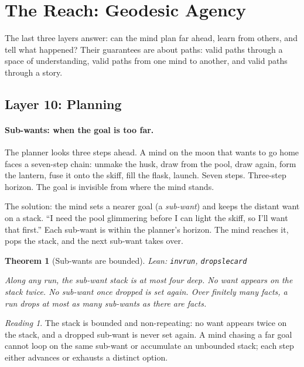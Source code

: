 \documentclass[11pt]{article}
\newcommand{\leanus}{\textunderscore\allowbreak}
\newcommand{\lean}[1]{{\let\_\leanus\texttt{#1}}}
\newtheorem{theorem}{Theorem}[section]
\theoremstyle{remark}
\newtheorem*{reading}{Reading}
\begin{document}

\section{The Reach: Geodesic Agency}
\label{sec:reach}

The last three layers answer: can the mind plan far ahead, learn from others, and tell
what happened? Their guarantees are about paths: valid paths through a space of
understanding, valid paths from one mind to another, and valid paths through a story.

\subsection{Layer 10: Planning}

\paragraph{Sub-wants: when the goal is too far.}

The planner looks three steps ahead. A mind on the moon that wants to go home faces a
seven-step chain: unmake the husk, draw from the pool, draw again, form the lantern, fuse
it onto the skiff, fill the flask, launch. Seven steps. Three-step horizon. The goal is
invisible from where the mind stands.

The solution: the mind sets a nearer goal (a \emph{sub-want}) and keeps the distant want
on a stack. ``I need the pool glimmering before I can light the skiff, so I'll want that
first.'' Each sub-want is within the planner's horizon. The mind reaches it, pops the
stack, and the next sub-want takes over.

\begin{theorem}[Sub-wants are bounded]
{\small\sloppy Lean: \lean{inv\_run}, \lean{drops\_le\_card}\par}
Along any run, the sub-want stack is at most four deep. No want appears on the stack
twice. No sub-want once dropped is set again. Over finitely many facts, a run drops at
most as many sub-wants as there are facts.
\end{theorem}

\begin{reading}
The stack is bounded and non-repeating: no want appears twice on the stack, and a dropped
sub-want is never set again. A mind chasing a far goal cannot loop on the same sub-want
or accumulate an unbounded stack; each step either advances or exhausts a distinct option.
\end{reading}
\end{document}
